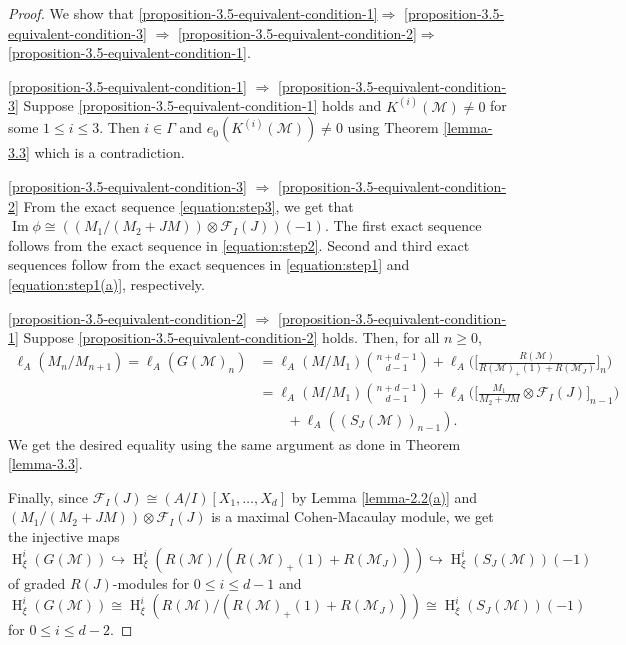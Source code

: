 \documentclass[11pt,reqno]{amsart}
\theoremstyle{definition}
\def\F{{\mathcal F}}
\def\M{{\mathcal M}}
\DeclareMathOperator{\h}{H}
\DeclareMathOperator{\im}{Im}
\numberwithin{equation}{section}
\begin{document}
\begin{proof} We show that \ref{proposition-3.5-equivalent-condition-1}$\Rightarrow$ \ref{proposition-3.5-equivalent-condition-3} $\Rightarrow$ \ref{proposition-3.5-equivalent-condition-2}$\Rightarrow$ \ref{proposition-3.5-equivalent-condition-1}.
	\item \ref{proposition-3.5-equivalent-condition-1}  $\Rightarrow$ \ref{proposition-3.5-equivalent-condition-3} 
	Suppose \ref{proposition-3.5-equivalent-condition-1} holds and $K^{(i)}(\M)\neq 0$ for some $1\leq i\leq 3$. Then $i\in\Gamma$ and $e_0(K^{(i)}(\M))\neq 0$ using Theorem \ref{lemma-3.3} which is  a contradiction. 
	
	\item \ref{proposition-3.5-equivalent-condition-3}  $\Rightarrow$ \ref{proposition-3.5-equivalent-condition-2}
	From the exact sequence  \eqref{equation:step3}, we get that $\im \phi\cong ((M_1/(M_2+JM))\otimes\F_I(J))(-1)$. The first exact sequence follows from the exact sequence in \eqref{equation:step2}. Second and third exact sequences follow from the exact sequences in \eqref{equation:step1} and \eqref{equation:step1(a)}, respectively. 
	\item \ref{proposition-3.5-equivalent-condition-2}  $\Rightarrow$ \ref{proposition-3.5-equivalent-condition-1} Suppose \ref{proposition-3.5-equivalent-condition-2}
	holds. Then, for all $n\geq 0$,
	\begin{align*}
		\ell_A(M_n/M_{n+1})=\ell_A(G(\mathcal{M})_n)&=\ell_A(M/M_1)\binom{n+d-1}{d-1}+\ell_A\Big(\Big[\frac{R(\M)}{R(\M)_{+}(1)+R(\M_J)}\Big]_n\Big)\\
		&=\ell_A(M/M_1)\binom{n+d-1}{d-1}+\ell_A\Big(\Big[\frac{M_1}{M_2+JM}\otimes\F_I(J)\Big]_{n-1}\Big)\\
        &\qquad+\ell_A((S_J(\M))_{n-1}).
	\end{align*}
	We get the desired equality using the same argument as done in Theorem \ref{lemma-3.3}.
	
	Finally, since $\F_I(J) \cong (A/I)[X_1,\ldots,X_d]$ by Lemma \ref{lemma-2.2(a)} and  $(M_1/(M_2+JM))\otimes\F_I(J)$ is a maximal 
	Cohen-Macaulay module, we get the injective maps 
	$$\h_\xi^i(G(\M))\hookrightarrow \h_\xi^i(R(\M)/(R(\M)_+(1)+R(\M_J)))\hookrightarrow \h_\xi^i(S_J(\M))(-1)$$
	of graded $R(J)$-modules for $0\leq i\leq d-1$ 
	and $\h_\xi^i(G(\M))\cong \h_{\xi}^i(R(\M)/(R(\M)_+(1)+R(\M_J)))\cong \h_{\xi}^i(S_J(\M))(-1)$ for $0\leq i\leq d-2$.
\end{proof}
\end{document}
